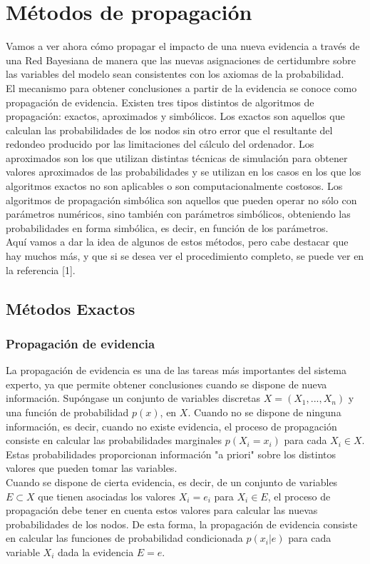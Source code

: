 \documentclass{article}
\theoremstyle{definition_wo_parentheses}
\begin{document}
\section{Métodos de propagación}
Vamos a ver ahora cómo propagar el impacto de una nueva evidencia a través de una Red Bayesiana de manera que las nuevas asignaciones de certidumbre sobre las variables del modelo sean consistentes con los axiomas de la probabilidad.\\
El mecanismo para obtener conclusiones a partir de la evidencia se conoce como propagación de evidencia. Existen tres tipos distintos de algoritmos de propagación: exactos, aproximados y simbólicos. Los exactos son aquellos que calculan las probabilidades de los nodos sin otro error que el resultante del redondeo producido por las limitaciones del cálculo del ordenador. Los aproximados son los que utilizan distintas técnicas de simulación para obtener valores aproximados de las probabilidades y se utilizan en los casos en los que los algoritmos exactos no son aplicables o son computacionalmente costosos. Los algoritmos de propagación simbólica son aquellos que pueden operar no sólo con parámetros numéricos, sino también con parámetros simbólicos, obteniendo las probabilidades en forma simbólica, es decir, en función de los parámetros.\\

Aquí vamos a dar la idea de algunos de estos métodos, pero cabe destacar que hay muchos más, y que si se desea ver el procedimiento completo, se puede ver en la referencia [1].

\subsection{Métodos Exactos}

\subsubsection{Propagación de evidencia}
La propagación de evidencia es una de las tareas más importantes del sistema experto, ya que permite obtener conclusiones cuando se dispone de nueva información. Supóngase un conjunto de variables discretas $X=(X_1,...,X_n)$ y una función de probabilidad $p(x)$, en $X$. Cuando no se dispone de ninguna información, es decir, cuando no existe evidencia, el proceso de propagación consiste en calcular las probabilidades marginales $p(X_i=x_i)$ para cada $X_i \in X$. Estas probabilidades proporcionan información "a priori" sobre los distintos valores que pueden tomar las variables.\\
Cuando se dispone de cierta evidencia, es decir, de un conjunto de variables $E \subset X$ que tienen asociadas los valores $X_i = e_i$ para $X_i \in E$, el proceso de propagación debe tener en cuenta estos valores para calcular las nuevas probabilidades de los nodos. De esta forma, la propagación de evidencia consiste en calcular las funciones de probabilidad condicionada $p(x_i|e)$ para cada variable $X_i$ dada la evidencia $E=e$.\\
\end{document}
